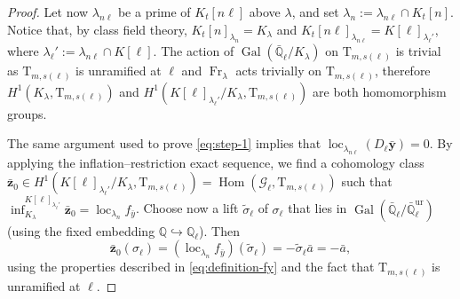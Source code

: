 \documentclass[12pt,reqno]{amsart}
\theoremstyle{definition}
\theoremstyle{remark}
\newcommand{\numberset}{\mathbb}
\newcommand{\Q}{\numberset{Q}}
\newcommand{\T}{\boldsymbol{\mathrm{T}}}
\DeclareMathOperator{\Hom}{Hom}
\DeclareMathOperator{\Gal}{Gal}
\DeclareMathOperator{\loc}{loc}
\DeclareMathOperator{\Fr}{Fr}
\newcommand{\ur}{\mathrm{ur}}
\newcommand{\gl}{\lambda}
\newcommand{\gs}{\sigma}
\begin{document}
\begin{proof}
    Let now $\gl_{n\ell}$ be a prime of $K_t[n\ell]$ above $\gl$, and set $\gl_n:=\gl_{n\ell}\cap K_t[n]$. Notice that, by class field theory, $K_t[n]_{\gl_n}=K_\gl$ and $K_t[n\ell]_{\gl_{n\ell}}=K[\ell]_{\gl_\ell'}$, where $\gl_\ell':=\gl_{n\ell}\cap K[\ell]$. The action of $\Gal(\bar{\Q}_\ell/K_\gl)$ on $\T_{m,s(\ell)}$ is trivial as $\T_{m,s(\ell)}$ is unramified at $\ell$ and $\Fr_\gl$ acts trivially on $\T_{m,s(\ell)}$, therefore $H^1(K_\gl,\T_{m,s(\ell)})$ and $H^1(K[\ell]_{\gl_{\ell}'}/K_\gl,\T_{m,s(\ell)})$ are both homomorphism groups.
    
    The same argument used to prove \eqref{eq:step-1} implies that $\loc_{\gl_{n\ell}}(D_\ell\bar{\boldsymbol{y}})=0$. By applying the inflation--restriction exact sequence, we find a cohomology class $\bar{\boldsymbol{z}}_0\in H^1(K[\ell]_{\gl_{\ell}'}/K_\gl,\T_{m,s(\ell)})=\Hom(\mathcal{G}_\ell,\T_{m,s(\ell)})$ such that $\inf_{K_\gl}^{K[\ell]_{\gl_{\ell}'}}\bar{\boldsymbol{z}}_0=\loc_{\gl_n}f_{\bar{y}}$. Choose now a lift $\tilde{\gs}_\ell$ of $\sigma_\ell$ that lies in $\Gal(\bar{\Q}_\ell/\bar{\Q}_\ell^{\ur})$ (using the fixed embedding $\Q\hookrightarrow\Q_\ell$). Then
    \begin{equation}\label{eq:relation-z0-a}
        \bar{\boldsymbol{z}}_0(\sigma_\ell)=(\loc_{\gl_n}f_{\bar{y}})(\tilde{\gs}_\ell)=-\tilde{\gs}_\ell\bar{a}=-\bar{a},
    \end{equation}
    using the properties described in \eqref{eq:definition-fy} and the fact that $\T_{m,s(\ell)}$ is unramified at $\ell$.


\end{proof}
\end{document}
